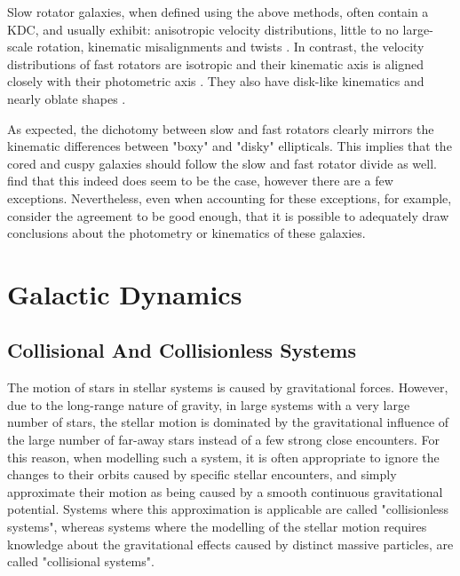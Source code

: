 \documentclass[english, twoside]{HYgradu}
\begin{document}
Slow rotator galaxies, when defined using the above methods, often contain a KDC, and usually exhibit: anisotropic velocity distributions, little to no large-scale rotation, kinematic misalignments and twists \citep{Emsellem2007, Cappellari2007}. In contrast, the velocity distributions of fast rotators are isotropic and their kinematic axis is aligned closely with their photometric axis \citep{Emsellem2007}. They also have disk-like kinematics and nearly oblate shapes \citep{Cappellari2007}. 

As expected, the dichotomy between slow and fast rotators clearly mirrors the kinematic differences between "boxy" and "disky" ellipticals. This implies that the cored and cuspy galaxies should follow the slow and fast rotator divide as well. \cite{Krajnovic2013} find that this indeed does seem to be the case, however there are a few exceptions. Nevertheless, even when accounting for these exceptions, \cite{Cappellari2016} for example, consider the agreement to be good enough, that it is possible to adequately draw conclusions about the photometry or kinematics of these galaxies.

\section{Galactic Dynamics}

\subsection{Collisional And Collisionless Systems} \label{section:collisionless}

The motion of stars in stellar systems is caused by gravitational forces. However, due to the long-range nature of gravity, in large systems with a very large number of stars, the stellar motion is dominated by the gravitational influence of the large number of far-away stars instead of a few strong close encounters. For this reason, when modelling such a system, it is often appropriate to ignore the changes to their orbits caused by specific stellar encounters, and simply approximate their motion as being caused by a smooth continuous gravitational potential. Systems where this approximation is applicable are called "collisionless systems", whereas systems where the modelling of the stellar motion requires knowledge about the gravitational effects caused by distinct massive particles, are called "collisional systems".
\end{document}
